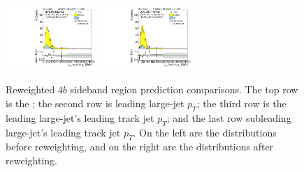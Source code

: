 \begin{figure}[htbp!]
\begin{center}
\includegraphics[width=0.31\textwidth,angle=-90]{figures/boosted/Prereweight/Moriond_FourTag_Sideband_sublHCand_trk0_Pt.pdf}
\includegraphics[width=0.31\textwidth,angle=-90]{figures/boosted/Sideband/b77_FourTag_Sideband_sublHCand_trk0_Pt.pdf}\\
\caption{Reweighted $4b$ sideband region prediction comparisons. The top row is the \mtwoJ; the second row is leading large-\R jet $p_{T}$; the third row is the leading large-\R jet's leading track jet $p_T$; and the last row subleading large-\R jet's leading track jet $p_T$. On the left are the distributions before reweighting, and on the right are the distributions after reweighting.}
\label{fig:rw-4b-comp-sb}
\end{center}
\end{figure}


